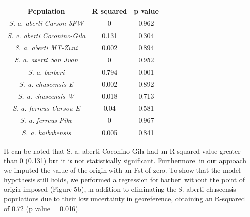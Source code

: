 \documentclass[
]{article}
\begin{document}
\begin{longtable}[]{@{}ccc@{}}
\toprule\noalign{}
Population & R squared & p value \\
\midrule\noalign{}
\endhead
\bottomrule\noalign{}
\endlastfoot
\textit{S. a. aberti Carson-SFW} & 0 & 0.962 \\
\textit{S. a. aberti Coconino-Gila} & 0.131 & 0.304 \\
\textit{S. a. aberti MT-Zuni} & 0.002 & 0.894 \\
\textit{S. a. aberti San Juan} & 0 & 0.952 \\
\textit{S. a. barberi} & 0.794 & 0.001 \\
\textit{S. a. chuscensis E} & 0.002 & 0.892 \\
\textit{S. a. chuscensis W} & 0.018 & 0.713 \\
\textit{S. a. ferreus Carson E} & 0.04 & 0.581 \\
\textit{S. a. ferreus Pike} & 0 & 0.967 \\
\textit{S. a. kaibabensis} & 0.005 & 0.841 \\
\end{longtable}

It can be noted that S. a. aberti Coconino-Gila had an R-squared value
greater than 0 (0.131) but it is not statistically significant.
Furthermore, in our approach we imputed the value of the origin with an
Fst of zero. To show that the model hypothesis still holds, we performed
a regression for barberi without the point of origin imposed (Figure
5b), in addition to eliminating the S. aberti chuscensis populations due
to their low uncertainty in georeference, obtaining an R-squared of 0.72
(p value = 0.016).
\end{document}
